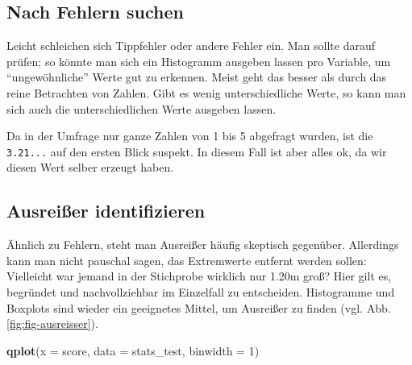 \documentclass[12pt,ngerman,]{book}
\makeatletter
\newenvironment{Shaded}{\begin{snugshade}}{\end{snugshade}}
\newcommand{\KeywordTok}[1]{\textcolor[rgb]{0.13,0.29,0.53}{\textbf{{#1}}}}
\newcommand{\DataTypeTok}[1]{\textcolor[rgb]{0.13,0.29,0.53}{{#1}}}
\newcommand{\DecValTok}[1]{\textcolor[rgb]{0.00,0.00,0.81}{{#1}}}
\newcommand{\StringTok}[1]{\textcolor[rgb]{0.31,0.60,0.02}{{#1}}}
\newcommand{\CommentTok}[1]{\textcolor[rgb]{0.56,0.35,0.01}{\textit{{#1}}}}
\newcommand{\NormalTok}[1]{{#1}}
\newenvironment{kframe}{%
\medskip{}
\setlength{\fboxsep}{.8em}
 \def\at@end@of@kframe{}%
 \ifinner\ifhmode%
  \def\at@end@of@kframe{\end{minipage}}%
  \begin{minipage}{\columnwidth}%
 \fi\fi%
 \def\FrameCommand##1{\hskip\@totalleftmargin \hskip-\fboxsep
 \colorbox{shadecolor}{##1}\hskip-\fboxsep
     \hskip-\linewidth \hskip-\@totalleftmargin \hskip\columnwidth}%
 \MakeFramed {\advance\hsize-\width
   \@totalleftmargin\z@ \linewidth\hsize
   \@setminipage}}%
 {\par\unskip\endMakeFramed%
 \at@end@of@kframe}
\renewenvironment{Shaded}{\begin{kframe}}{\end{kframe}}
\theoremstyle{definition}
\theoremstyle{definition}
\theoremstyle{remark}
\makeatother
\begin{document}
\subsection{Nach Fehlern suchen}\label{nach-fehlern-suchen}

Leicht schleichen sich Tippfehler oder andere Fehler ein. Man sollte
darauf prüfen; so könnte man sich ein Histogramm ausgeben lassen pro
Variable, um ``ungewöhnliche'' Werte gut zu erkennen. Meist geht das
besser als durch das reine Betrachten von Zahlen. Gibt es wenig
unterschiedliche Werte, so kann man sich auch die unterschiedlichen
Werte ausgeben lassen.

\begin{Shaded}
\end{Shaded}

Da in der Umfrage nur ganze Zahlen von 1 bis 5 abgefragt wurden, ist die
\texttt{3.21...} auf den ersten Blick suspekt. In diesem Fall ist aber
alles ok, da wir diesen Wert selber erzeugt haben.

\subsection{Ausreißer identifizieren}\label{ausreier-identifizieren}

Ähnlich zu Fehlern, steht man Ausreißer häufig skeptisch gegenüber.
Allerdings kann man nicht pauschal sagen, das Extremwerte entfernt
werden sollen: Vielleicht war jemand in der Stichprobe wirklich nur
1.20m groß? Hier gilt es, begründet und nachvollziehbar im Einzelfall zu
entscheiden. Histogramme und Boxplots sind wieder ein geeignetes Mittel,
um Ausreißer zu finden (vgl. Abb. \ref{fig:fig-ausreisser}).

\begin{Shaded}
\begin{Highlighting}[]
\KeywordTok{qplot}\NormalTok{(}\DataTypeTok{x =} \NormalTok{score, }\DataTypeTok{data =} \NormalTok{stats_test, }\DataTypeTok{binwidth =} \DecValTok{1}\NormalTok{)}
\end{Highlighting}
\end{Shaded}
\end{document}

